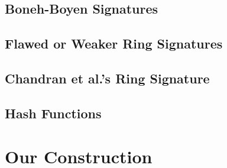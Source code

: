 \documentclass{llncs}
\begin{document}
        \subsection{Boneh-Boyen Signatures} \label{sec:bbs}
    
            

    \subsection{Flawed or Weaker Ring Signatures}\label{sec:rs-flawed}
    
         

       \subsection{Chandran et al.'s Ring Signature}
	
         

	\subsection{Hash Functions} \label{sec:hash}

	

    \section{Our Construction}

	
        
    	
        


\end{document}
